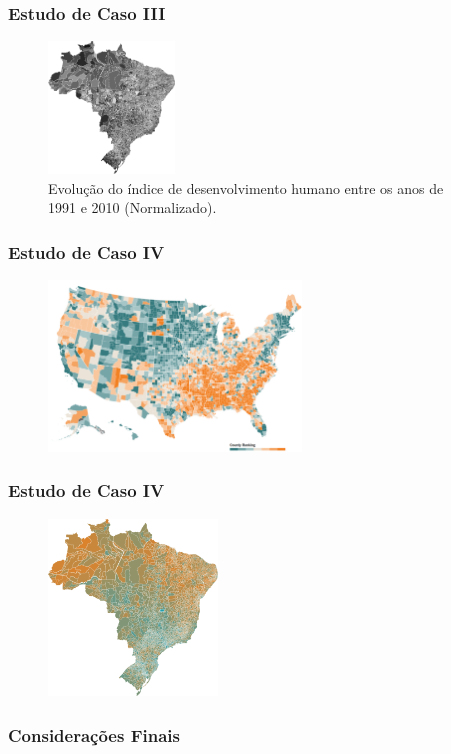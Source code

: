 \documentclass[aspectratio=169]{beamer}
\begin{document}
\begin{frame}
\frametitle{Estudo de Caso III}
\justifying


\begin{figure}
\centering
\includegraphics[width=0.3\textwidth]{images/evolucao.png}
\caption{Evolução do índice de desenvolvimento humano entre os anos de 1991 e 2010 (Normalizado).}
\end{figure}

\end{frame}

\begin{frame}
\frametitle{Estudo de Caso IV}
\justifying

\begin{figure}
\centering
\includegraphics[width=0.6\textwidth]{images/usa.png}
\end{figure}


\end{frame}

\begin{frame}
\frametitle{Estudo de Caso IV}
\justifying

\begin{figure}
\centering
\includegraphics[width=0.4\textwidth]{images/qualidade-de-vida.png}
\end{figure}


\end{frame}

\begin{frame}
\frametitle{Considerações Finais}
\justifying





\end{frame}
\end{document}
